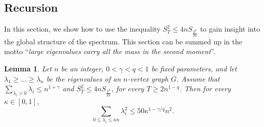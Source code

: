 \documentclass[11pt]{article}
\theoremstyle{plain}
\newtheorem{lemma}[theorem]{Lemma}
\theoremstyle{definition}
\begin{document}
\subsection{Recursion}\label{sect:recursion}

In this section, we show how to use the inequality $S_T^2\leq 4nS_{\frac{T^2}{2n}}$ to gain insight into the global structure of the spectrum. This section can be summed up in the motto ``\textit{large eigenvalues carry all the mass in the second moment}''.

\begin{lemma}\label{lemma:recursion}
Let $n$ be an integer, $0<\gamma<q<1$ be fixed parameters, and let $\lambda_1\geq\dots\geq \lambda_n$ be the eigenvalues of an $n$-vertex graph $G$. Assume that $\sum_{\lambda_i>0}\lambda_i\leq n^{1+\gamma}$ and $S_T^2\leq 4nS_{\frac{T^2}{2n}}$, for every $T\geq 2n^{1-q}$. Then for every $\kappa\in [0,1]$,
\begin{equation}\label{eqn:second_moment_bound}
    \sum_{0\leq \lambda_i\leq \kappa n}\lambda_i^2\leq 50\kappa^{1-\gamma/q}n^{2}.
\end{equation}
\end{lemma}
\end{document}
